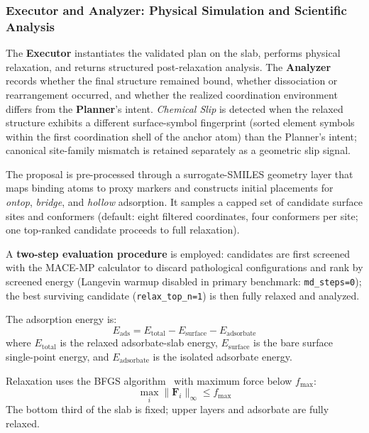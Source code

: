 \subsubsection{Executor and Analyzer: Physical Simulation and Scientific Analysis}

The \textbf{Executor} instantiates the validated plan on the slab, performs physical relaxation, and returns structured post-relaxation analysis.
The \textbf{Analyzer} records whether the final structure remained bound, whether dissociation or rearrangement occurred, and whether the realized coordination environment differs from the \textbf{Planner}'s intent.
\textit{Chemical Slip} is detected when the relaxed structure exhibits a different surface-symbol fingerprint (sorted element symbols within the first coordination shell of the anchor atom) than the Planner's intent; canonical site-family mismatch is retained separately as a geometric slip signal.

The proposal is pre-processed through a surrogate-SMILES geometry layer that maps binding atoms to proxy markers and constructs initial placements for \textit{ontop}, \textit{bridge}, and \textit{hollow} adsorption.
It samples a capped set of candidate surface sites and conformers (default: eight filtered coordinates, four conformers per site; one top-ranked candidate proceeds to full relaxation).

A \textbf{two-step evaluation procedure} is employed: candidates are first screened with the MACE-MP calculator to discard pathological configurations and rank by screened energy (Langevin warmup disabled in primary benchmark: \texttt{md\_steps=0}); the best surviving candidate (\texttt{relax\_top\_n=1}) is then fully relaxed and analyzed.

The adsorption energy is:
\begin{equation}
    E_{\text{ads}} = E_{\text{total}} - E_{\text{surface}} - E_{\text{adsorbate}}
\end{equation}
where $E_{\text{total}}$ is the relaxed adsorbate-slab energy, $E_{\text{surface}}$ is the bare surface single-point energy, and $E_{\text{adsorbate}}$ is the isolated adsorbate energy.

Relaxation uses the BFGS algorithm~\cite{nocedal2006numerical} with maximum force below $f_{\text{max}}$:
\begin{equation}
    \max_{i} \| \mathbf{F}_i \|_{\infty} \le f_{\text{max}}
\end{equation}
The bottom third of the slab is fixed; upper layers and adsorbate are fully relaxed.

